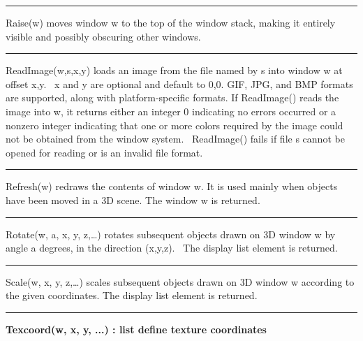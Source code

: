 \bigskip\hrule\vspace{0.1cm}

\noindent
\textsf{Raise(w)} moves window \textsf{w} to the top of the window
stack, making it entirely visible and possibly obscuring other windows.

\bigskip\hrule\vspace{0.1cm}

\noindent
\textsf{ReadImage(w,s,x,y)} loads an image from the file named by s into
window w at offset \textsf{x,y}. \textsf{\ x} and \textsf{y} are
optional and default to 0,0. GIF, JPG, and BMP formats are supported,
along with platform-specific formats. If \textsf{ReadImage()} reads the
image into \textsf{w}, it returns either an integer 0 indicating no
errors occurred or a nonzero integer indicating that one or more colors
required by the image could not be obtained from the window system.
\ \textsf{ReadImage()} fails if file \textsf{s} cannot be opened for
reading or is an invalid file format.

\bigskip\hrule\vspace{0.1cm}

\noindent
\textsf{Refresh(w) }redraws the contents of window \textsf{w}. It is
used mainly when objects have been moved in a 3D scene. The window
\textsf{w} is returned. 

\bigskip\hrule\vspace{0.1cm}

\noindent
\textsf{Rotate(w, a, x, y, z,{\dots})} rotates subsequent objects drawn
on 3D window \textsf{w} by angle \textsf{a} degrees, in the direction
(\textsf{x,y,z}). \ The display list element is returned.

\bigskip\hrule\vspace{0.1cm}

\noindent
\textsf{Scale(w, x, y, z,{\dots})} scales subsequent objects drawn on 3D
window \textsf{w} according to the given coordinates. The display list
element is returned.

\bigskip\hrule\vspace{0.1cm}
\noindent
{\bf Texcoord(w, x, y, ...) : list \hfill define texture coordinates}

